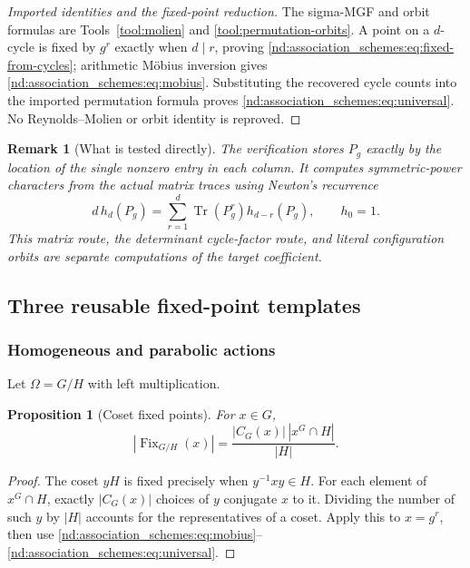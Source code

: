 \documentclass[10pt]{article}
\newcommand{\Fix}{\operatorname{Fix}}
\newtheorem{proposition}{Proposition}
\newtheorem{remark}{Remark}
\begin{document}
\begin{proof}[Imported identities and the fixed-point reduction]
The sigma-MGF and orbit formulas are Tools~\ref{tool:molien} and
\ref{tool:permutation-orbits}.  A point on a $d$-cycle is fixed by $g^r$
exactly when $d\mid r$, proving
\eqref{nd:association_schemes:eq:fixed-from-cycles}; arithmetic M\"obius
inversion gives \eqref{nd:association_schemes:eq:mobius}.  Substituting the
recovered cycle counts into the imported permutation formula proves
\eqref{nd:association_schemes:eq:universal}.  No Reynolds--Molien or orbit
identity is reproved.
\end{proof}

\begin{remark}[What is tested directly]
The verification stores $P_g$ exactly by the location of the single nonzero
entry in each column.  It computes symmetric-power characters from the actual
matrix traces using Newton's recurrence
\[
 d\,h_d(P_g)=\sum_{r=1}^d\operatorname{Tr}(P_g^r)h_{d-r}(P_g),\qquad h_0=1.
\]
This matrix route, the determinant cycle-factor route, and literal
configuration orbits are separate computations of the target coefficient.
\end{remark}

\subsection{Three reusable fixed-point templates}

\subsubsection{Homogeneous and parabolic actions}

Let $\Omega=G/H$ with left multiplication.

\begin{proposition}[Coset fixed points]\label{nd:association_schemes:prop:coset}
For $x\in G$,
\begin{equation}\label{nd:association_schemes:eq:coset}
 \boxed{|\Fix_{G/H}(x)|
 =\frac{|C_G(x)|\,|x^G\cap H|}{|H|}.}
\end{equation}
\end{proposition}

\begin{proof}
The coset $yH$ is fixed precisely when $y^{-1}xy\in H$.  For each element of
$x^G\cap H$, exactly $|C_G(x)|$ choices of $y$ conjugate $x$ to it.  Dividing
the number of such $y$ by $|H|$ accounts for the representatives of a coset.
Apply this to $x=g^r$, then use \eqref{nd:association_schemes:eq:mobius}--\eqref{nd:association_schemes:eq:universal}.
\end{proof}
\end{document}
